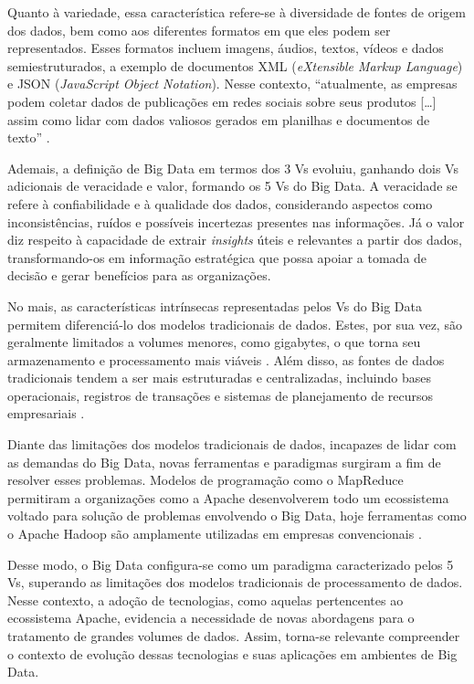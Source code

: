 Quanto à variedade, essa característica refere-se à diversidade de fontes de origem dos dados,
bem como aos diferentes formatos em que eles podem ser representados. Esses formatos incluem
imagens, áudios, textos, vídeos e dados semiestruturados, a exemplo de documentos XML
(\textit{eXtensible Markup Language}) e JSON (\textit{JavaScript Object Notation}). Nesse contexto, ``atualmente, as empresas podem coletar
dados de publicações em redes sociais sobre seus produtos […] assim como lidar com dados
valiosos gerados em planilhas e documentos de texto'' \cite[p. 27]{sherman2015business}.

Ademais, a definição de Big Data em termos dos 3 Vs evoluiu, ganhando dois Vs adicionais 
de veracidade e valor, formando os 5 Vs do Big Data. A veracidade se refere à confiabilidade
e à qualidade dos dados, considerando aspectos como inconsistências, ruídos e possíveis 
incertezas presentes nas informações. Já o valor diz respeito à capacidade de extrair 
\textit{insights} úteis e relevantes a partir dos dados, transformando-os em informação estratégica 
que possa apoiar a tomada de decisão e gerar benefícios para as organizações.

No mais, as características intrínsecas representadas pelos Vs do Big Data permitem 
diferenciá-lo dos modelos tradicionais de dados. Estes, por sua vez, são geralmente 
limitados a volumes menores, como gigabytes, o que torna seu armazenamento e processamento 
mais viáveis \cite{siddiqui2024bigdata}. Além disso, as fontes de dados tradicionais tendem a ser 
mais estruturadas e centralizadas, incluindo bases operacionais, registros de transações e 
sistemas de planejamento de recursos empresariais \cite{siddiqui2024bigdata}.

Diante das limitações dos modelos tradicionais de dados, incapazes de lidar com as demandas 
do Big Data, novas ferramentas e paradigmas surgiram a fim de resolver esses problemas. 
Modelos de programação como o MapReduce permitiram a organizações como a Apache 
desenvolverem todo um ecossistema voltado para solução de problemas envolvendo o Big Data, 
hoje ferramentas como o Apache Hadoop são amplamente utilizadas em empresas convencionais 
\cite{white2012hadoop}.

Desse modo, o Big Data configura-se como um paradigma caracterizado pelos 5 Vs, superando as limitações 
dos modelos tradicionais de processamento de dados. Nesse contexto, a adoção de tecnologias, como aquelas 
pertencentes ao ecossistema Apache, evidencia a necessidade de novas abordagens para o tratamento de grandes 
volumes de dados. Assim, torna-se relevante compreender o contexto de evolução dessas tecnologias e suas 
aplicações em ambientes de Big Data.


